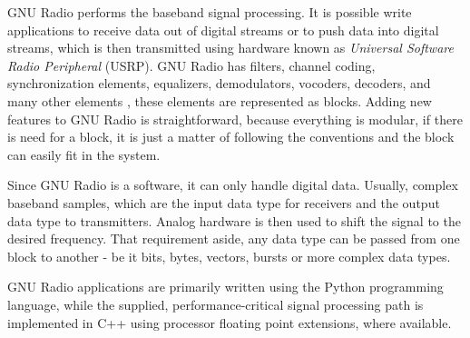 



GNU Radio performs the baseband signal processing. It is possible write
applications to receive data out of digital streams or to push data into digital
streams, which is then transmitted using hardware known as \textit{Universal
Software Radio Peripheral} (USRP). GNU Radio has filters, channel coding,
synchronization elements, equalizers, demodulators, vocoders, decoders, and many
other elements , these elements are represented as blocks. Adding new features
to GNU Radio is straightforward, because everything is modular, if there is need
for a block, it is just a matter of following the conventions and the block can
easily fit in the system.

Since GNU Radio is a software, it can only handle digital data. Usually, complex
baseband samples, which are the input data type for receivers and the output
data type to transmitters. Analog hardware is then used to shift the signal to
the desired frequency. That requirement aside, any data type can be passed from
one block to another - be it bits, bytes, vectors, bursts or more complex data
types.

GNU Radio applications are primarily written using the Python programming
language, while the supplied, performance-critical signal processing path is
implemented in C++ using processor floating point extensions, where available.


